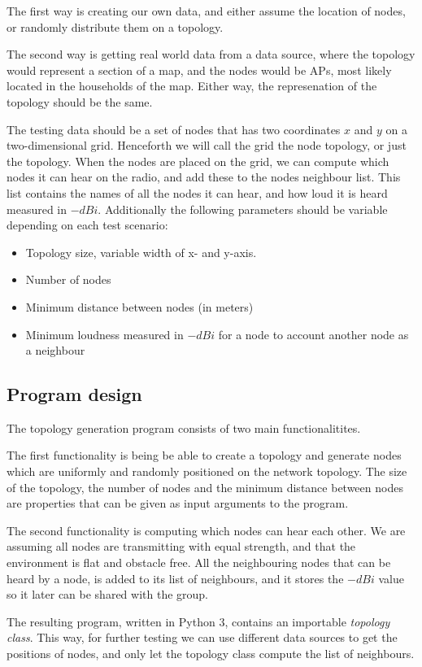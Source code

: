 \documentclass[a4paper,UKenglish]{report}
\begin{document}
The first way is creating our own data, and either assume the location of nodes,
or randomly distribute them on a topology.

The second way is getting real world data from a data source, where the topology would represent a section of a map, and the nodes would be APs,
most likely located in the households of the map.
Either way, the represenation of the topology should be the same. 

The testing data should be a set of nodes that has two coordinates $x$ and $y$ on a two-dimensional grid. Henceforth we will call the grid 
the node topology, or just the topology. When the nodes are placed on the
grid, we can compute which nodes it can hear on the radio, and add these to the nodes neighbour list. This list contains the
names of all the nodes it can hear, and how loud it is heard measured in $-dBi$. Additionally
the following parameters should be variable depending on each test scenario:
\begin{itemize}
	\item Topology size, variable width of x- and y-axis.
	\item Number of nodes
	\item Minimum distance between nodes (in meters)
	\item Minimum loudness measured in $-dBi$ for a node to account another node as a neighbour
\end{itemize}

\subsection{Program design}
The topology generation program consists of two main functionalitites.

The first functionality is being  be able to create a topology and generate nodes which are uniformly
and randomly positioned on the network topology. The size of the topology, the number of nodes and the minimum distance
between nodes are properties that can be given as input arguments to the program. 

The second functionality is computing which nodes can hear each other. We are assuming all nodes
are transmitting with equal strength, and that the environment is flat and obstacle free. 
All the neighbouring nodes that can be heard by a node, is added to its list of neighbours, and it stores the $-dBi$ value so it later can be shared with
the group. 

The resulting program, written in Python 3\cite{Python3}, contains an importable \textit{topology class}. This way, for further testing we can use different data sources to get the positions of nodes,
and only let the topology class compute the list of neighbours. 
\end{document}
